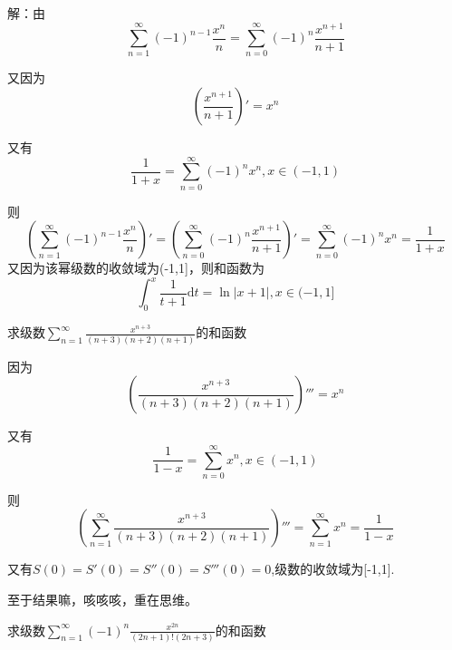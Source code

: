 \documentclass[lang=cn,10pt]{elegantbook}
\begin{document}
		解：由
		\begin{equation*}
			\sum_{n=1}^{\infty } (-1)^{n-1}\frac{x^{n} }{n}=\sum_{n=0}^{\infty } (-1)^{n}\frac{x^{n+1} }{n+1}
		\end{equation*}
		
		又因为
		\begin{equation*}
			({\frac{x^{n+1} }{n+1}})' =x^{n}
		\end{equation*}
		
		又有
		\begin{equation*}
			\frac{1}{1+x}=\sum_{n=0}^{\infty }(-1)^{n}x^{n},x \in (-1,1)
		\end{equation*}
	
		则
		\begin{equation*}
			(\sum_{n=1}^{\infty } (-1)^{n-1}\frac{x^{n} }{n})'=(\sum_{n=0}^{\infty } (-1)^{n}\frac{x^{n+1} }{n+1})'=\sum_{n=0}^{\infty }(-1)^{n}x^{n}=\frac{1}{1+x}
		\end{equation*}
	又因为该幂级数的收敛域为(-1,1]，则和函数为
		\begin{equation*}
			\int_{0}^{x}\frac{1}{t+1}  \mathrm{d}t =\ln |x+1|, x\in (-1,1]
		\end{equation*}
		
		\begin{example}
			求级数$\sum_{n=1}^{\infty }\frac{x^{n+3}}{(n+3)(n+2)(n+1)}$的和函数
		\end{example}
		
		因为
		\begin{equation*}
			(\frac{x^{n+3}}{(n+3)(n+2)(n+1)})''' =x^{n}
		\end{equation*}
		
		又有
		\begin{equation*}
			\frac{1}{1-x}=\sum_{n=0}^{\infty }x^{n},x \in (-1,1)
		\end{equation*}
		
		则
		\begin{equation*}
			(\sum_{n=1}^{\infty }\frac{x^{n+3}}{(n+3)(n+2)(n+1)})'''=\sum_{n=1}^{\infty }x^{n}=\frac{1}{1-x}
		\end{equation*}
		
		又有$S(0)=S'(0)=S''(0)=S'''(0)=0$,级数的收敛域为[-1,1].
		
		至于结果嘛，咳咳咳，重在思维。
		
		\begin{example}
			求级数$\sum_{n=1}^{\infty }(-1)^{n}\frac{x^{2n}}{(2n+1)!(2n+3)}$的和函数
		\end{example}
		
\end{document}
